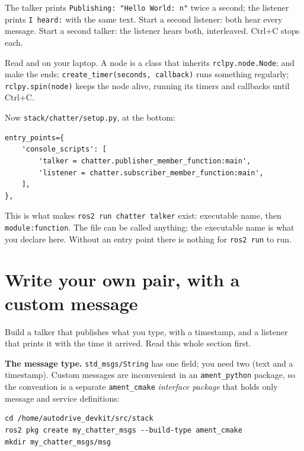 \documentclass[11pt,a4paper]{article}
\begin{document}
The talker prints \texttt{Publishing: "Hello World: n"} twice a second; the listener prints
\texttt{I heard:} with the same text. Start a second listener: both hear every message. Start a
second talker: the listener hears both, interleaved. Ctrl+C stops each.

Read  and
 on your laptop. A node is a class that inherits
\texttt{rclpy.node.Node};  and
 make the ends;
\texttt{create\_timer(seconds, callback)} runs something regularly; \texttt{rclpy.spin(node)}
keeps the node alive, running its timers and callbacks until Ctrl+C.

Now \texttt{stack/chatter/setup.py}, at the bottom:

\begin{lstlisting}
entry_points={
    'console_scripts': [
        'talker = chatter.publisher_member_function:main',
        'listener = chatter.subscriber_member_function:main',
    ],
},
\end{lstlisting}

This is what makes \texttt{ros2 run chatter talker} exist: executable name, then
\texttt{module:function}. The file can be called anything; the executable name is what you
declare here. Without an entry point there is nothing for \texttt{ros2 run} to run.

\section{Write your own pair, with a custom message}
\label{sec:custom}

Build a talker that publishes what you type, with a timestamp, and a listener that prints it
with the time it arrived. Read this whole section first.

\textbf{The message type.} \texttt{std\_msgs/String} has one field; you need two (text and a
timestamp). Custom messages are inconvenient in an \texttt{ament\_python} package, so the
convention is a separate \texttt{ament\_cmake} \emph{interface package} that holds only message
and service definitions:

\begin{lstlisting}
cd /home/autodrive_devkit/src/stack
ros2 pkg create my_chatter_msgs --build-type ament_cmake
mkdir my_chatter_msgs/msg
\end{lstlisting}
\end{document}
